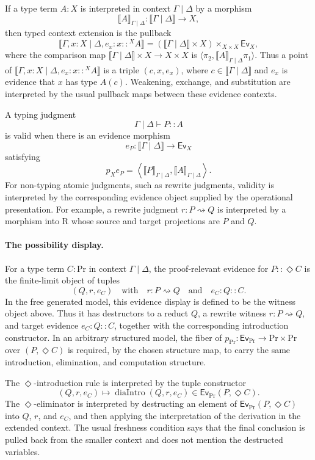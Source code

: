 \documentclass[11pt]{article}
\newcommand{\Proc}{\mathrm{Pr}}
\newcommand{\Rew}{\mathrm{R}}
\newcommand{\rw}{\rightsquigarrow}
\newcommand{\ty}{\mathrel{::}}
\newcommand{\Dia}{\Diamond}
\newcommand{\Ev}{\mathsf{Ev}}
\begin{document}
If a type term \(A:X\) is interpreted in context \(\Gamma\mid\Delta\) by a
morphism
\[
  \llbracket A\rrbracket_{\Gamma\mid\Delta}:
  \llbracket\Gamma\mid\Delta\rrbracket\longrightarrow X,
\]
then typed context extension is the pullback
\[
  \llbracket\Gamma,x:X\mid\Delta,e_x:x\ty^X A\rrbracket
  =
  (\llbracket\Gamma\mid\Delta\rrbracket\times X)
  \times_{X\times X}
  \Ev_X,
\]
where the comparison map
\(\llbracket\Gamma\mid\Delta\rrbracket\times X\to X\times X\) is
\(\langle\pi_2,\llbracket A\rrbracket_{\Gamma\mid\Delta}\pi_1\rangle\).
Thus a point of
\(\llbracket\Gamma,x:X\mid\Delta,e_x:x\ty^X A\rrbracket\) is a triple
\((c,x,e_x)\), where \(c\in\llbracket\Gamma\mid\Delta\rrbracket\) and
\(e_x\) is evidence that \(x\) has type \(A(c)\).  Weakening, exchange, and
substitution are interpreted by the usual pullback maps between these evidence
contexts.

A typing judgment
\[
  \Gamma\mid\Delta\vdash P\ty A
\]
is valid when there is an evidence morphism
\[
  e_P:\llbracket\Gamma\mid\Delta\rrbracket\longrightarrow\Ev_X
\]
satisfying
\[
  p_X e_P
  =
  \left\langle
    \llbracket P\rrbracket_{\Gamma\mid\Delta},
    \llbracket A\rrbracket_{\Gamma\mid\Delta}
  \right\rangle .
\]
For non-typing atomic judgments, such as rewrite judgments, validity is
interpreted by the corresponding evidence object supplied by the operational
presentation.  For example, a rewrite judgment \(r:P\rw Q\) is interpreted by a
morphism into \(\Rew\) whose source and target projections are
\(P\) and \(Q\).

\paragraph{The possibility display.}
For a type term \(C:\Proc\) in context \(\Gamma\mid\Delta\), the proof-relevant evidence
for \(P\ty\Dia C\) is the finite-limit object of tuples
\[
  (Q,r,e_C)
  \quad\text{with}\quad
  r:P\rw Q
  \quad\text{and}\quad
  e_C:Q\ty C.
\]
In the free generated model, this evidence display is defined to be the witness
object above.  Thus it has destructors to a reduct \(Q\), a rewrite witness
\(r:P\rw Q\), and target evidence \(e_C:Q\ty C\), together with the
corresponding introduction constructor.  In an arbitrary structured model, the
fiber of \(p_\Proc:\Ev_\Proc\to\Proc\times\Proc\) over \((P,\Dia C)\) is
required, by the chosen structure map, to carry the same introduction,
elimination, and computation structure.

The \(\Dia\)-introduction rule is interpreted by the tuple constructor
\[
  (Q,r,e_C)
  \longmapsto
  \operatorname{diaIntro}(Q,r,e_C)
  \in
  \Ev_\Proc(P,\Dia C).
\]
The \(\Dia\)-eliminator is interpreted by destructing an element of
\(\Ev_\Proc(P,\Dia C)\) into \(Q\), \(r\), and \(e_C\), and then applying the
interpretation of the derivation in the extended context.  The usual freshness
condition says that the final conclusion is pulled back from the smaller context
and does not mention the destructed variables.
\end{document}

